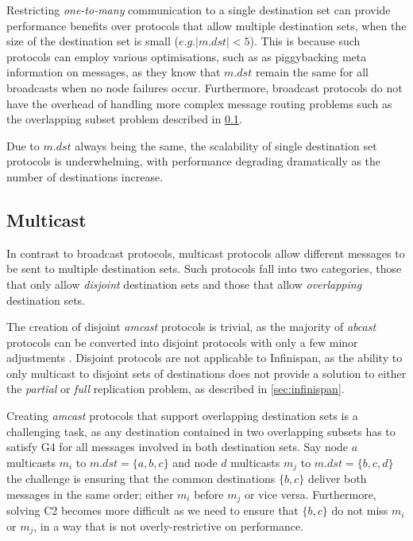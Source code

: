 	Restricting \emph{one-to-many} communication to a single destination set can provide performance benefits over protocols that allow multiple destination sets, when the size of the destination set is small ($e.g. \left\vert{m.dst}\right\vert < 5$).   This is because such protocols can employ various optimisations, such as as piggybacking meta information on messages, as they know that $m.dst$ remain the same for all broadcasts when no node failures occur.  Furthermore, broadcast protocols do not have the overhead of handling more complex message routing problems such as the overlapping subset problem described in \ref{ssec:atomic_multicast}.  
	
	Due to $m.dst$ always being the same, the scalability of single destination set protocols is underwhelming, with performance degrading dramatically as the number of destinations increase.  
	
	\subsection{Multicast}\label{ssec:atomic_multicast}
	In contrast to broadcast protocols, multicast protocols allow different messages to be sent to multiple destination sets.  Such protocols fall into two categories, those that only allow \emph{disjoint} destination sets and those that allow \emph{overlapping} destination sets.  
	
	The creation of disjoint \emph{amcast} protocols is trivial, as the majority of \emph{abcast} protocols can be converted into disjoint protocols with only a few minor adjustments \cite{Defago:2004:TOB:1041680.1041682}.  Disjoint protocols are not applicable to Infinispan, as the ability to only multicast to disjoint sets of destinations does not provide a solution to either the \emph{partial} or \emph{full} replication problem, as described in \ref{sec:infinispan}.  
        
        Creating \emph{amcast} protocols that support overlapping destination sets is a challenging task, as any destination contained in two overlapping subsets has to satisfy G4 for all messages involved in both destination sets.  Say node $a$ multicasts $m_i$ to $m.dst = \{a,b,c\}$ and node $d$ multicasts $m_j$ to $m.dst = \{b,c,d\}$ the challenge is ensuring that the common destinations $\{b,c\}$ deliver both messages in the same order; either $m_i$ before $m_j$ or vice versa.  Furthermore, solving C2 becomes more difficult as we need to ensure that $\{b,c\}$ do not miss $m_i$ or $m_j$, in a way that is not overly-restrictive on performance.  
        
